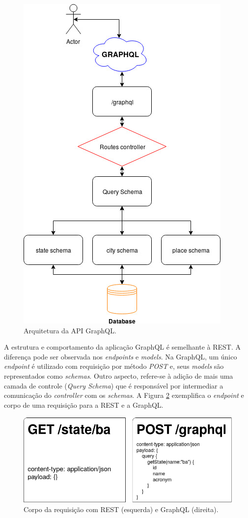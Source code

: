 \documentclass[conference]{IEEEtran}
\begin{document}
\begin{figure}[htbp]
\centerline{\includegraphics[scale=0.45]{imgs/da_graphql.jpg}}
\caption{Arquitetura da API GraphQL.}
\label{fig:arq_graphql}
\end{figure}

A estrutura e comportamento da aplicação GraphQL é semelhante à REST. A diferença pode ser observada nos \textit{endpoints} e \textit{models}. Na GraphQL, um único \textit{endpoint} é utilizado com requisição por método \textit{POST} e, seus \textit{models} são representados como \textit{schemas}. Outro aspecto, refere-se à adição de mais uma camada de controle (\textit{Query Schema}) que é responsável por intermediar a comunicação do \textit{controller} com os \textit{schemas}. A Figura \ref{fig:req_rg} exemplifica o \textit{endpoint} e corpo de uma requisição para a REST e a GraphQL.

\begin{figure}[htbp]
\centerline{\includegraphics[scale=0.30]{imgs/req_rest_graphql.jpg}}
\caption{Corpo da requisição com REST (esquerda) e GraphQL (direita).}
\label{fig:req_rg}
\end{figure}
\end{document}
